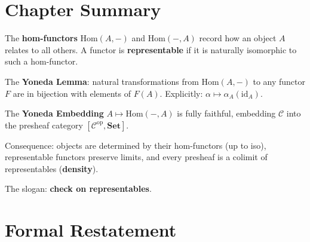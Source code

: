 \section*{Chapter Summary}

\begin{summarybox}
The \textbf{hom-functors} $\mathrm{Hom}(A, -)$ and $\mathrm{Hom}(-, A)$
record how an object $A$ relates to all others. A functor is
\textbf{representable} if it is naturally isomorphic to such a hom-functor.

The \textbf{Yoneda Lemma}: natural transformations from
$\mathrm{Hom}(A, -)$ to any functor $F$ are in bijection with elements
of $F(A)$. Explicitly: $\alpha \mapsto \alpha_A(\mathrm{id}_A)$.

The \textbf{Yoneda Embedding} $A \mapsto \mathrm{Hom}(-, A)$ is fully
faithful, embedding $\mathcal{C}$ into the presheaf category
$[\mathcal{C}^{\mathrm{op}}, \mathbf{Set}]$.

Consequence: objects are determined by their hom-functors (up to iso),
representable functors preserve limits, and every presheaf is a colimit
of representables (\textbf{density}).

The slogan: \textbf{check on representables}.
\end{summarybox}


\section*{Formal Restatement}


